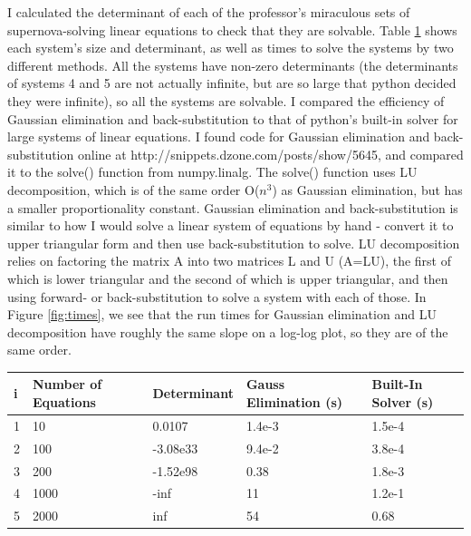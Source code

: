 \documentclass{article}
\begin{document}
I calculated the determinant of each of the professor's miraculous sets of
supernova-solving linear equations to check that they are solvable.  Table
\ref{tab:linsys} shows each system's size and determinant, as well as times to
solve the systems by two different methods.  All the systems have non-zero
determinants (the determinants of systems 4 and 5 are not actually infinite, but
are so large that python decided they were infinite), so all the systems are solvable.
I compared the efficiency of Gaussian elimination and back-substitution to that of
python's built-in solver for large systems of linear equations.  I found code
for Gaussian elimination and back-substitution online at
http://snippets.dzone.com/posts/show/5645, and compared it to the solve() function from
numpy.linalg.  The solve() function uses LU decomposition, which is of the same
order O($n^3$) as Gaussian elimination, but has a smaller proportionality constant.
Gaussian elimination and back-substitution is similar to how I would solve a linear
system of equations by hand - convert it to upper triangular form and then use back-substitution
to solve.  LU decomposition relies on factoring the matrix A into two matrices L and U (A=LU),
the first of which is lower triangular and the second of which is upper triangular, and then using
forward- or back-substitution to solve a system with each of those.
In Figure \ref{fig:times}, we see that the run times for Gaussian elimination and LU
decomposition have roughly the same slope on a log-log plot, so they are of the same order.

\begin{table}[p]
\centering
\begin{tabular}{|l|l|l|l|l|}
\hline
i & Number of Equations & Determinant & Gauss Elimination (s) & Built-In Solver (s) \\
\hline
1 & 10 & 0.0107 & 1.4e-3 & 1.5e-4 \\
2 & 100 & -3.08e33 & 9.4e-2 & 3.8e-4 \\
3 & 200 & -1.52e98 & 0.38 & 1.8e-3 \\
4 & 1000 & -inf & 11 & 1.2e-1 \\
5 & 2000 & inf & 54 & 0.68 \\
\hline
\end{tabular}
\label{tab:linsys}
\end{table}
\end{document}
